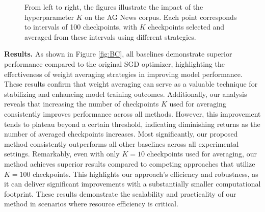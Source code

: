 \begin{figure*}[t!]
    \centering
    \centering
    \vspace{-0.2cm}
    \caption{From left to right, the figures illustrate the impact of the hyperparameter $K$ on the AG News corpus. Each point corresponds to intervals of 100 checkpoints, with $K$ checkpoints selected and averaged from these intervals using different strategies.
    }
    \label{fig:ag}
\end{figure*}

\textbf{Results.} 
As shown in Figure \ref{fig:BC}, all baselines demonstrate superior performance compared to the original SGD optimizer, highlighting the effectiveness of weight averaging strategies in improving model performance. These results confirm that weight averaging can serve as a valuable technique for stabilizing and enhancing model training outcomes. 
Additionally, our analysis reveals that increasing the number of checkpoints $K$ used for averaging consistently improves performance across all methods. However, this improvement tends to plateau beyond a certain threshold, indicating diminishing returns as the number of averaged checkpoints increases.
%
Most significantly, our proposed method consistently outperforms all other baselines across all experimental settings. Remarkably, even with only $K=10$ checkpoints used for averaging, our method achieves superior results compared to competing approaches that utilize $K=100$ checkpoints. This highlights our approach's efficiency and robustness, as it can deliver significant improvements with a substantially smaller computational footprint. These results demonstrate the scalability and practicality of our method in scenarios where resource efficiency is critical.


